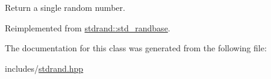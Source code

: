 Return a single random number. 



Reimplemented from \hyperlink{classstdrand_1_1std__randbase_a76e2d3761b0d1409f41dc73c8a87b0d5}{stdrand\+::std\+\_\+randbase}.



The documentation for this class was generated from the following file\+:\begin{DoxyCompactItemize}
\item 
includes/\hyperlink{stdrand_8hpp}{stdrand.\+hpp}\end{DoxyCompactItemize}
